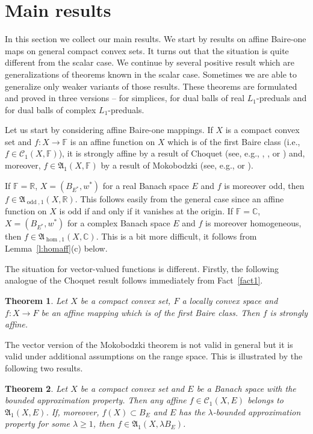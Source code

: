 \documentclass{amsart}
\numberwithin{equation}{section}
\newtheorem{thm}{Theorem}[section]
\theoremstyle{definition}
\def\fra{\mathfrak{A}}
\def\C{\mathcal C}
\def\ce{\mathbb C}
\def\ef{\mathbb F}
\def\er{\mathbb R}
\def\hom{\operatorname{hom}}
\def\odd{\operatorname{odd}}
\begin{document}
\section{Main results}\label{Sec:main}

In this section we collect our main results. We start by results on affine Baire-one maps on general compact convex sets.
It turns out that the situation is quite different from the scalar case. We continue by several positive result which are
generalizations of theorems known in the scalar case. Sometimes we are able to generalize only weaker variants of those results. These theorems are formulated and proved in three versions -- for simplices, for dual balls of real $L_1$-preduals and for dual balls of complex $L_1$-preduals.

Let us start by considering affine Baire-one mappings.
If $X$ is a compact convex set and $f:X\to\ef$ is an affine function on $X$ which is of the first Baire class (i.e., $f\in\C_1(X,\ef)$), it is strongly affine by a result of Choquet (see, e.g., \cite[Theorem~I.2.6]{alfsen}, \cite[Section 14]{phelps-choquet}, \cite{sray} or \cite[Corollary 4.22]{lmns}) and, moreover, $f\in\fra_1(X,\ef)$ by a result of Mokobodzki (see, e.g., \cite[Th\'eor\`eme 80]{rogalski} or \cite[Theorem 4.24]{lmns}).

If $\ef=\er$, $X=(B_{E^*},w^*)$ for a real Banach space $E$ and $f$ is moreover odd, then $f\in\fra_{\odd,1}(X,\er)$. This follows easily from the general case since an affine function on $X$ is odd if and only if it vanishes at the origin.
If $\ef=\ce$, $X=(B_{E^*},w^*)$ for a complex Banach space $E$ and $f$ is moreover homogeneous, then $f\in \fra_{\hom,1}(X,\ce)$. This is a bit more difficult, it follows from Lemma~\ref{l:homaff}(c) below.

The situation for vector-valued functions is different. Firstly, the following analogue of the Choquet result follows immediately from Fact~\ref{fact1}.	

\begin{thm}\label{T:c1sa}
 Let $X$ be a compact convex set, $F$ a  locally convex space and $f:X\to F$ be an affine mapping which is of the first Baire class. Then $f$ is strongly affine.
\end{thm}

The vector version of the Mokobodzki theorem is not valid in general but it is valid under additional assumptions on the range space. This is illustrated by the following two results.

\begin{thm}\label{T:bap} Let $X$ be a compact convex set and $E$ be a Banach space with the bounded approximation property.
Then any affine $f\in\C_1(X,E)$ belongs to $\fra_1(X,E)$. If, moreover, $f(X)\subset B_E$ and $E$ has the $\lambda$-bounded approximation property for some $\lambda\ge1$, then $f\in\fra_1(X,\lambda B_E)$.
\end{thm}
\end{document}
